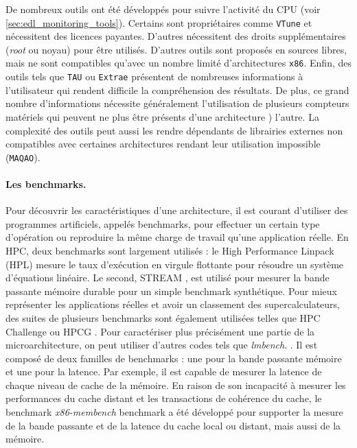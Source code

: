         De nombreux outils ont été développés pour suivre l'activité du CPU (voir \autoref{sec:edl_monitoring_tools}). Certains sont propriétaires comme \verb|VTune|\cite{reinders2005vtune} et nécessitent des licences payantes. D'autres nécessitent des droits supplémentaires (\textit{root} ou noyau) pour être utilisés. D'autres outils sont proposés en sources libres, mais ne sont compatibles qu'avec un nombre limité d’architectures \verb=x86=. Enfin, des outils tels que \verb=TAU= ou \verb=Extrae= présentent de nombreuses informations à l'utilisateur qui rendent difficile la compréhension des résultats. De plus, ce grand nombre d'informations nécessite généralement l'utilisation de plusieurs compteurs matériels qui peuvent ne plus être présents d'une architecture ) l'autre. La complexité des outils peut aussi les rendre dépendants de librairies externes non compatibles avec certaines architectures rendant leur utilisation impossible (\verb|MAQAO|).

        \paragraph{Les benchmarks.} Pour découvrir les caractéristiques d'une architecture, il est courant d'utiliser des programmes artificiels, appelés benchmarks, pour effectuer un certain type d'opération ou reproduire la même charge de travail qu'une application réelle. En HPC, deux benchmarks sont largement utilisés : le High Performance Linpack (HPL) \cite{Dongarra2003} mesure le taux d'exécution en virgule flottante pour résoudre un système d'équations linéaire. Le second, STREAM \cite{McCalpin1995}, est utilisé pour mesurer la bande passante mémoire durable pour un simple benchmark synthétique. Pour mieux représenter les applications réelles et avoir un classement des supercalculateurs, des suites de plusieurs benchmarks sont également utilisées telles que HPC Challenge \cite{Ang2016} ou HPCG \cite{dongarra2016high}. Pour caractériser plus précisément une partie de la microarchitecture, on peut utiliser d'autres codes tels que \textit{lmbench}. \cite{Staelin2004}. Il est composé de deux familles de benchmarks : une pour la bande passante mémoire et une pour la latence. Par exemple, il est capable de mesurer la latence de chaque niveau de cache de la mémoire. En raison de son incapacité à mesurer les performances du cache distant et les transactions de cohérence du cache, le benchmark \textit{x86-membench} benchmark \cite{Molka2017b} a été développé pour supporter la mesure de la bande passante et de la latence du cache local ou distant, mais aussi de la mémoire. 
        
